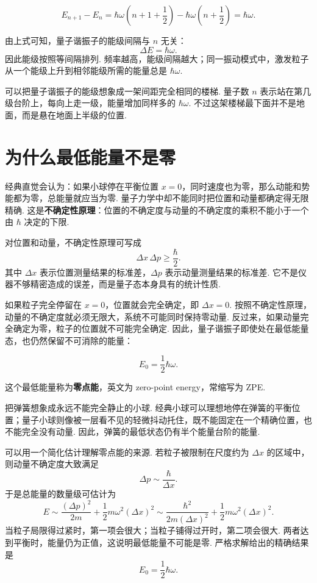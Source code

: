 \documentclass[UTF8,11pt,a4paper,openany]{ctexbook}
\newcommand{\term}[1]{\textbf{#1}}
\begin{document}
\[
E_{n+1}-E_n
=\hbar\omega\left(n+1+\frac12\right)
-\hbar\omega\left(n+\frac12\right)
=\hbar\omega.
\]

\begin{derivationbox}
由上式可知，量子谐振子的能级间隔与 $n$ 无关：
\[
\Delta E=\hbar\omega.
\]
因此能级按照等间隔排列. 频率越高，能级间隔越大；同一振动模式中，激发粒子从一个能级上升到相邻能级所需的能量总是 $\hbar\omega$. 
\end{derivationbox}

\begin{analogybox}
可以把量子谐振子的能级想象成一架间距完全相同的楼梯. 量子数 $n$ 表示站在第几级台阶上，每向上走一级，能量增加同样多的 $\hbar\omega$. 不过这架楼梯最下面并不是地面，而是悬在地面上半级的位置. 
\end{analogybox}

\section{为什么最低能量不是零}

经典直觉会认为：如果小球停在平衡位置 $x=0$，同时速度也为零，那么动能和势能都为零，总能量就应当为零. 量子力学中却不能同时把位置和动量都确定得无限精确. 这是\term{不确定性原理}：位置的不确定度与动量的不确定度的乘积不能小于一个由 $\hbar$ 决定的下限. 

\begin{definitionbox}
对位置和动量，不确定性原理可写成
\[
\Delta x\,\Delta p\geq\frac{\hbar}{2}.
\]
其中 $\Delta x$ 表示位置测量结果的标准差，$\Delta p$ 表示动量测量结果的标准差. 它不是仪器不够精密造成的误差，而是量子态本身具有的统计性质. 
\end{definitionbox}

如果粒子完全停留在 $x=0$，位置就会完全确定，即 $\Delta x=0$. 按照不确定性原理，动量的不确定度就必须无限大，系统不可能同时保持零动量. 反过来，如果动量完全确定为零，粒子的位置就不可能完全确定. 因此，量子谐振子即使处在最低能量态，也仍然保留不可消除的能量：

\[
E_0=\frac12\hbar\omega.
\]

这个最低能量称为\term{零点能}，英文为 zero-point energy，常缩写为 ZPE. 

\begin{analogybox}
把弹簧想象成永远不能完全静止的小球. 经典小球可以理想地停在弹簧的平衡位置；量子小球则像被一层看不见的轻微抖动托住，既不能固定在一个精确位置，也不能完全没有动量. 因此，弹簧的最低状态仍有半个能量台阶的能量. 
\end{analogybox}

\begin{derivationbox}
可以用一个简化估计理解零点能的来源. 若粒子被限制在尺度约为 $\Delta x$ 的区域中，则动量不确定度大致满足
\[
\Delta p\sim\frac{\hbar}{\Delta x}.
\]
于是总能量的数量级可估计为
\[
E\sim\frac{(\Delta p)^2}{2m}
+\frac12m\omega^2(\Delta x)^2
\sim\frac{\hbar^2}{2m(\Delta x)^2}
+\frac12m\omega^2(\Delta x)^2.
\]
当粒子局限得过紧时，第一项会很大；当粒子铺得过开时，第二项会很大. 两者达到平衡时，能量仍为正值，这说明最低能量不可能是零. 严格求解给出的精确结果是
\[
E_0=\frac12\hbar\omega.
\]
\end{derivationbox}
\end{document}
